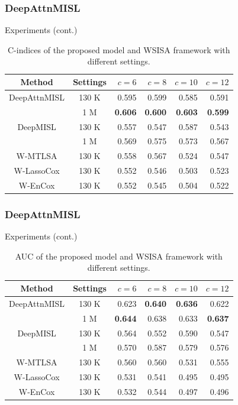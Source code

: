 \documentclass{beamer}
\begin{document}
	\begin{frame}
		\frametitle{DeepAttnMISL}
		Experiments (cont.)
		
		\begin{table}[H]
			\begin{center}
				\begin{tabular}{ c c r r r r }
					\hline
					Method & Settings & $c = 6$ & $c = 8$ & $c = 10$ & $c = 12$ \\
					\hline
					DeepAttnMISL & 130 K & 0.595 & 0.599 & 0.585 & 0.591 \\ 
					& 1 M & \textbf{0.606} & \textbf{0.600} & \textbf{0.603} & \textbf{0.599} \\
					DeepMISL & 130 K & 0.557 & 0.547 & 0.587 &	0.543 \\
					& 1 M & 0.569 & 0.575 & 0.573 & 0.567 \\
					W-MTLSA & 130 K & 0.558 & 0.567 & 0.524 & 0.547 \\
					W-LassoCox & 130 K & 0.552 & 0.546 & 0.503 & 0.523 \\
					W-EnCox & 130 K & 0.552 & 0.545 & 0.504 & 0.522 \\
					\hline
				\end{tabular}
			\end{center}
			\caption{C-indices of the proposed model and WSISA framework with different settings.}
		\end{table} 
		
	\end{frame}
	
	\begin{frame}
		\frametitle{DeepAttnMISL}
		Experiments (cont.)
		
		\begin{table}[H]
			\begin{center}
				\begin{tabular}{ c c r r r r }
					\hline
					Method & Settings & $c = 6$ & $c = 8$ & $c = 10$ & $c = 12$ \\
					\hline
					DeepAttnMISL & 130 K & 0.623 & \textbf{0.640} & \textbf{0.636} & 0.622 \\ 
					& 1 M & \textbf{0.644} & 0.638 & 0.633 & \textbf{0.637} \\
					DeepMISL & 130 K & 0.564 & 0.552 & 0.590 & 	0.547 \\
					& 1 M & 0.570 & 0.587 & 0.579 & 0.576 \\
					W-MTLSA & 130 K & 0.560 & 0.560 & 0.531 & 	0.555 \\
					W-LassoCox & 130 K & 0.531 & 0.541 & 0.495 & 0.495 \\
					W-EnCox & 130 K & 0.532 & 0.544 & 0.497 & 0.496 \\
					\hline
				\end{tabular}
			\end{center}
			\caption{AUC of the proposed model and WSISA framework with different settings.}
		\end{table} 
		
	\end{frame}
	
\end{document}
